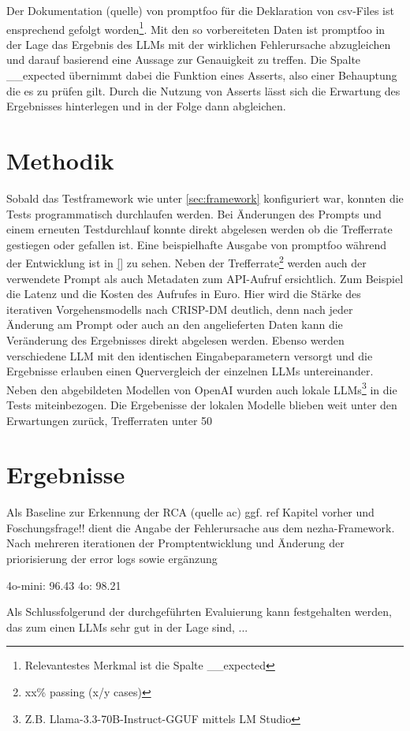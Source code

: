 Der Dokumentation (quelle) von promptfoo für die Deklaration von csv-Files ist ensprechend gefolgt worden\footnote{Relevantestes Merkmal ist die Spalte \_\_expected}. Mit den so vorbereiteten Daten ist promptfoo in der Lage das Ergebnis des \ac{LLM}s mit der wirklichen Fehlerursache abzugleichen und darauf basierend eine Aussage zur Genauigkeit zu treffen. Die Spalte \_\_expected übernimmt dabei die Funktion eines Asserts, also einer Behauptung die es zu prüfen gilt. Durch die Nutzung von Asserts lässt sich die Erwartung des Ergebnisses hinterlegen und in der Folge dann abgleichen. 

\section{Methodik}
Sobald das Testframework wie unter \autoref{sec:framework} konfiguriert war, konnten die Tests programmatisch durchlaufen werden. Bei Änderungen des Prompts und einem erneuten Testdurchlauf konnte direkt abgelesen werden ob die Trefferrate gestiegen oder gefallen ist. Eine beispielhafte Ausgabe von promptfoo während der Entwicklung ist in \autoref{} zu sehen. Neben der Trefferrate\footnote{xx\% passing (x/y cases)} werden auch der verwendete Prompt als auch Metadaten zum \ac{API}-Aufruf ersichtlich. Zum Beispiel die Latenz und die Kosten des Aufrufes in Euro. Hier wird die Stärke des iterativen Vorgehensmodells nach \ac{CRISP-DM} deutlich, denn nach jeder Änderung am Prompt oder auch an den angelieferten Daten kann die Veränderung des Ergebnisses direkt abgelesen werden. Ebenso werden verschiedene \ac{LLM} mit den identischen Eingabeparametern versorgt und die Ergebnisse erlauben einen Quervergleich der einzelnen \ac{LLM}s untereinander. Neben den abgebildeten Modellen von OpenAI wurden auch lokale LLMs\footnote{Z.B. Llama-3.3-70B-Instruct-GGUF mittels LM Studio} in die Tests miteinbezogen. Die Ergebenisse der lokalen Modelle blieben weit unter den Erwartungen zurück, Trefferraten unter 50%

\section{Ergebnisse}
Als Baseline zur Erkennung der RCA (quelle ac) ggf. ref Kapitel vorher und Foschungsfrage!! dient die Angabe der Fehlerursache aus dem nezha-Framework. Nach mehreren iterationen der Promptentwicklung und Änderung der priorisierung der error logs sowie ergänzung 

4o-mini: 96.43%
4o: 98.21%

Als Schlussfolgerund der durchgeführten Evaluierung kann festgehalten werden, das zum einen LLMs sehr gut in der Lage sind, ...